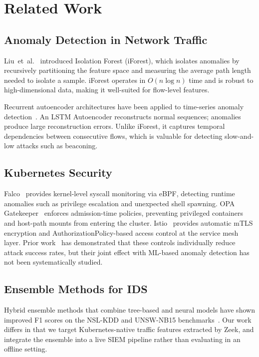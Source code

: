 \section{Related Work}
\label{sec:related}

\subsection{Anomaly Detection in Network Traffic}
Liu~et~al.~\cite{liu2008isolation} introduced Isolation Forest (iForest),
which isolates anomalies by recursively partitioning the feature space and
measuring the average path length needed to isolate a sample.
iForest operates in $O(n \log n)$ time and is robust to high-dimensional data,
making it well-suited for flow-level features.

Recurrent autoencoder architectures have been applied to time-series anomaly
detection~\cite{malhotra2016lstm}.
An LSTM Autoencoder reconstructs normal sequences; anomalies produce large
reconstruction errors.
Unlike iForest, it captures temporal dependencies between consecutive flows,
which is valuable for detecting slow-and-low attacks such as beaconing.

\subsection{Kubernetes Security}
Falco~\cite{falco2023} provides kernel-level syscall monitoring via eBPF,
detecting runtime anomalies such as privilege escalation and unexpected
shell spawning.
OPA Gatekeeper~\cite{opa2023} enforces admission-time policies, preventing
privileged containers and host-path mounts from entering the cluster.
Istio~\cite{istio2023} provides automatic mTLS encryption and
AuthorizationPolicy-based access control at the service mesh layer.
Prior work~\cite{shamim2020xi} has demonstrated that these controls
individually reduce attack success rates, but their joint effect with
ML-based anomaly detection has not been systematically studied.

\subsection{Ensemble Methods for IDS}
Hybrid ensemble methods that combine tree-based and neural models have shown
improved F1 scores on the NSL-KDD and UNSW-NB15 benchmarks~\cite{kim2020lstm}.
Our work differs in that we target Kubernetes-native traffic features
extracted by Zeek, and integrate the ensemble into a live SIEM pipeline
rather than evaluating in an offline setting.
